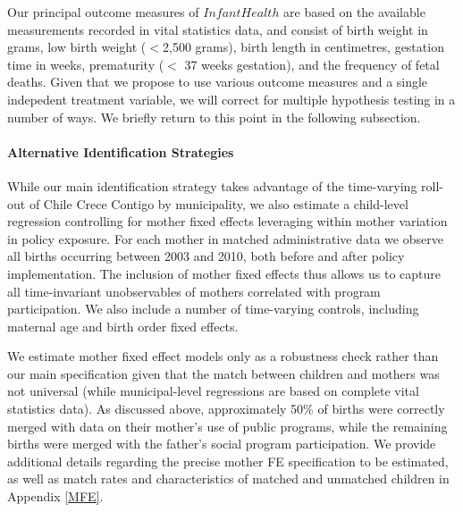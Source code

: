 \documentclass[12pt]{article}
\begin{document}
\begin{spacing}{1.4}
Our principal outcome measures of $InfantHealth$ are based on
the available measurements recorded in vital statistics data,
and consist of birth weight in grams, low birth weight
($<$2,500 grams), birth length in centimetres, gestation time
in weeks, prematurity ($<$ 37 weeks gestation), and the frequency
of fetal deaths.  Given that we propose to use various outcome
measures and a single indepedent treatment variable, we will
correct for multiple hypothesis testing in a number of ways.  We
briefly return to this point in the following subsection.

\paragraph{Alternative Identification Strategies}
While our main identification strategy takes advantage of
the time-varying roll-out of Chile Crece Contigo by municipality,
we also estimate a child-level regression controlling for mother
fixed effects leveraging within mother variation in policy exposure.
For each mother in matched administrative data we observe all
births occurring between 2003 and 2010, both before and after policy
implementation.  The inclusion of mother fixed effects thus allows
us to capture all time-invariant unobservables of mothers correlated
with program participation.  We also include a number of time-varying
controls, including maternal age and birth order fixed effects.

We estimate mother fixed effect models only as a robustness check
rather than our main specification given that the match between
children and mothers was not universal (while municipal-level regressions
are based on complete vital statistics data).  As discussed above,
approximately 50\% of births were correctly merged with data on
their mother's use of public programs, while the remaining births
were merged with the father's social program participation.
We provide additional details regarding the precise mother FE
specification to be estimated, as well as match rates and
characteristics of matched and unmatched children in Appendix
\ref{MFE}.


\end{spacing}
\end{document}

